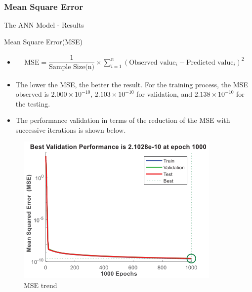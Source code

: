 \documentclass{beamer}
\begin{document}
\subsubsection{Mean Square Error}
\begin{frame}{The ANN Model - Results}
\vspace{-1.5mm}
\begin{block}{Mean Square Error(MSE)}
    \begin{itemize}
        \justifying
        \item \;
        \vspace{-6mm}\begin{align*}
            \text{MSE}=\dfrac{1}{\text{Sample Size(n)}}\times \sum_{i=1}^n(\text{Observed value}_i-\text{Predicted value}_i)^2
        \end{align*}\vspace{-6.5mm}
        \item The lower the MSE, the better the result. For the training process, the MSE observed is $2.000 \times 10^{-10}$, $2.103 \times 10^{-10}$ for validation, and $2.138 \times 10^{-10}$ for the testing.\vspace{-1mm}
        \item The performance validation in terms of the reduction of the MSE with successive iterations is shown below.
    \end{itemize}\vspace{-3mm}
    \begin{figure}
        \centering
        \includegraphics[width=0.35\columnwidth]{Figures/MSE-trend.png}\vspace{-2mm}
        \caption{MSE trend}
        \label{MSE-trend}
    \end{figure}\vspace{-6mm}
    \end{block}
\end{frame}
\end{document}
